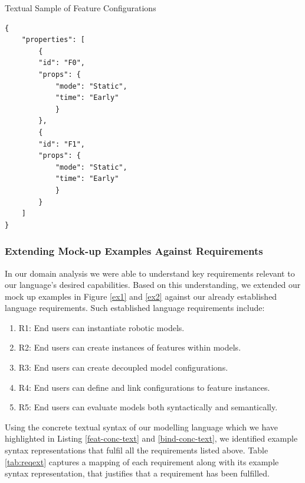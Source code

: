 \documentclass[conference]{IEEEtran}
\begin{document}
\begin{listing}[H]
\caption{Textual Sample of Feature Configurations}
\begin{verbatim}
{
	"properties": [
	    {
	    "id": "F0",
	    "props": {
	        "mode": "Static",
	        "time": "Early"
	    	}
	    },
	    {
	    "id": "F1",
	    "props": {
	        "mode": "Static",
	        "time": "Early"
	    	}
	    }
	]
}
\end{verbatim}
\label{bind-conc-text}
\end{listing}

\subsubsection{Extending Mock-up Examples Against Requirements}
In our domain analysis we were able to understand key requirements relevant to our language's desired capabilities. Based on this understanding, we extended our mock up examples in Figure \ref{ex1} and \ref{ex2} against our already established language requirements. Such established language requirements include:
\begin{enumerate}
    \item R1: End users can instantiate robotic models.
    \item R2: End users can create instances of features within models.
    \item R3: End users can create decoupled model configurations.
    \item R4: End users can define and link configurations to feature instances.
    \item R5: End users can evaluate models both syntactically and semantically.
\end{enumerate}
Using the concrete textual syntax of our modelling language which we have highlighted in Listing \ref{feat-conc-text} and \ref{bind-conc-text}, we identified example syntax representations that fulfil all the requirements listed above. Table \ref{tab:reqext} captures a mapping of each requirement along with its example syntax representation, that justifies that a requirement has been fulfilled.
\end{document}
